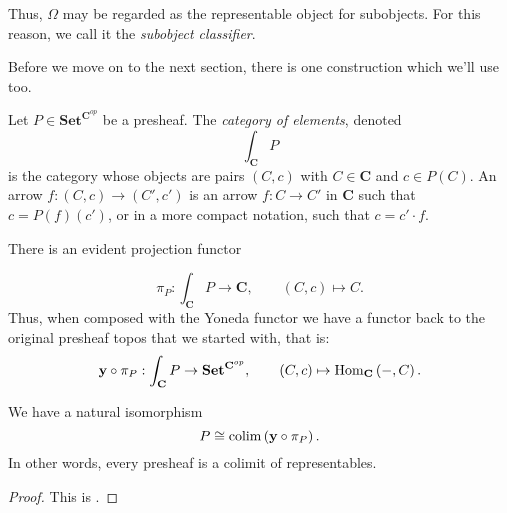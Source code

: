 Thus, $\Omega$ may be regarded as the representable object for subobjects. For this reason, we call it the \emph{subobject classifier}.

Before we move on to the next section, there is one construction which we'll use too.

\begin{definition}
\label{def:category of elements}
Let $P \in \mathbf{Set}^{\mathbf{C}^{op}}$ be a presheaf. The \emph{category of elements}, denoted
\[ \int_\mathbf{C} P \]
is the category whose objects are pairs $(C,c)$ with $C \in \mathbf{C}$ and $c \in P(C)$. An arrow $f : (C,c) \to (C',c')$ is an arrow $f : C \to C'$ in $\mathbf{C}$ such that $c = P(f)(c')$, or in a more compact notation, such that $c = c' \cdot f$.
\end{definition}

There is an evident projection functor

\[ \pi_P : \int_{\mathbf{C}} P \to \mathbf{C}, \qquad (C,c) \mapsto C. \]
Thus, when composed with the Yoneda functor we have a functor back to the original presheaf topos that we started with, that is:
\[ \mathbf{y} \circ \pi_P : \int_{\mathbf{C}} P \to \mathbf{Set}^{\mathbf{C}^{op}}, \qquad (C,c) \mapsto \operatorname{Hom}_{\mathbf{C}}\left(-,C \right). \]

\begin{proposition}
\label{prop:every presheaf is a colimit of representables}
We have a natural isomorphism
\[ P \cong \operatorname*{colim} \left( \mathbf{y} \circ \pi_P \right). \]
In other words, every presheaf is a colimit of representables.
\end{proposition}
\begin{proof}
This is \cite[Corollary I.3]{MacLaneMoerdijk91}.
\end{proof}


